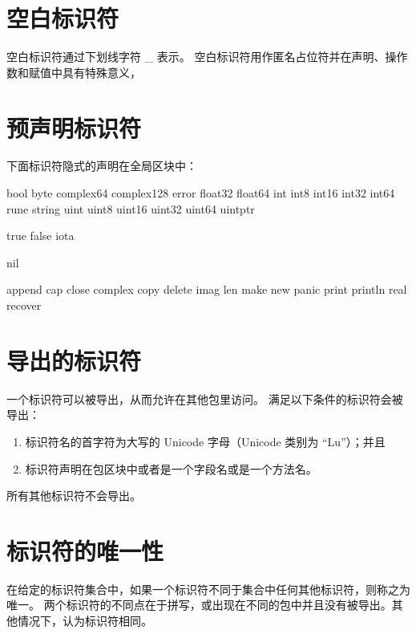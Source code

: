 \section{空白标识符}
空白标识符通过下划线字符 \_ 表示。
空白标识符用作匿名占位符并在声明、操作数和赋值中具有特殊意义，

\section{预声明标识符}
下面标识符隐式的声明在全局区块中：
\begin{description}[style=nextline,leftmargin=3\parindent]
\item[Types:] 	
	{\ttfamily bool byte complex64 complex128 error float32 float64 int int8 int16 int32 int64 rune string	uint uint8 uint16 uint32 uint64 uintptr}
\item[Constants:] 
	{\ttfamily true false iota}
\item[Zero value:] 
	{\ttfamily nil}
\item[Functions:] 
	{\ttfamily append cap close complex copy delete imag len make new panic print println real recover}
\end{description}


\section{导出的标识符}
一个标识符可以被导出，从而允许在其他包里访问。
满足以下条件的标识符会被导出：
\begin{enumerate}
\item 标识符名的首字符为大写的 Unicode 字母（Unicode 类别为 ``Lu''）；并且
\item 标识符声明在包区块中或者是一个字段名或是一个方法名。
\end{enumerate}
所有其他标识符不会导出。

\section{标识符的唯一性}
在给定的标识符集合中，如果一个标识符不同于集合中任何其他标识符，则称之为唯一。
两个标识符的不同点在于拼写，或出现在不同的包中并且没有被导出。其他情况下，认为标识符相同。

